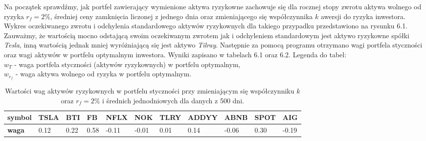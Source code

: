 \documentclass[magister]{dyplom}
\begin{document}
Na początek sprawdźmy, jak portfel zawierający wymienione aktywa ryzykowne zachowuje się dla rocznej stopy zwrotu aktywa wolnego od ryzyka $r_f = 2\%$, średniej ceny zamknięcia liczonej z jednego dnia oraz zmieniającego się współczynnika $k$ awersji do ryzyka inwestora. Wykres oczekiwanego zwrotu i odchylenia standardowego aktywów ryzykownych dla takiego przypadku przedstawiono na rysunku 6.1.
Zauważmy, że wartością mocno odstającą swoim oczekiwanym zwrotem jak i odchyleniem standardowym jest aktywo ryzykowne spółki \textit{Tesla}, inną wartością jednak mniej wyróżniającą się jest aktywo \textit{Tilray}.
Następnie za pomocą programu otrzymano wagi portfela styczności oraz wagi aktywów w portfelu optymalnym inwestora. Wyniki zapisano w tabelach 6.1 oraz 6.2.\newline
Legenda do tabel:\\
$w_T$ - waga portfela styczności (aktywów ryzykownych) w portfelu optymalnym,\\
$w_{r_f}$ - waga aktywa wolnego od ryzyka w portfelu optymalnym.\\
\begin{table}[ht]
	\centering
	\caption{Wartości wag aktywów ryzykownych w portfelu styczności przy zmieniającym się współczynniku $k$ oraz $r_f = 2\%$ i średnich jednodniowych dla danych z 500 dni.}
	\begin{tabular}{|l|l|l|l|l|l|l|l|l|l|l|}
		\hline
		\textbf{symbol} & \textbf{TSLA} & \textbf{BTI} & \textbf{FB} & \textbf{NFLX} & \textbf{NOK} & \textbf{TLRY} & \textbf{ADDYY} & \textbf{ABNB} & \textbf{SPOT} & \textbf{AIG} \\ \hline
		\textbf{waga}   & 0.12       & 0.22          & 0.58           & -0.11        & -0.01         & 0.01         & 0.14        & -0.06          & 0.30          & -0.19        \\ \hline
	\end{tabular}
\end{table}
\end{document}
